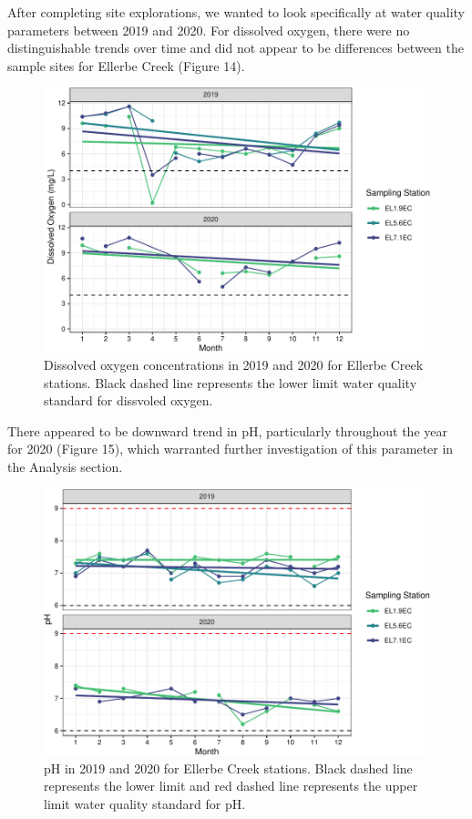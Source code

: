 \documentclass[
  12pt,
]{article}
\begin{document}
After completing site explorations, we wanted to look specifically at
water quality parameters between 2019 and 2020. For dissolved oxygen,
there were no distinguishable trends over time and did not appear to be
differences between the sample sites for Ellerbe Creek (Figure 14).

\begin{figure}
\centering
\includegraphics{August_Lindborg_ENV872_Project_files/figure-latex/unnamed-chunk-15-1.pdf}
\caption{Dissolved oxygen concentrations in 2019 and 2020 for Ellerbe
Creek stations. Black dashed line represents the lower limit water
quality standard for dissvoled oxygen.}
\end{figure}

There appeared to be downward trend in pH, particularly throughout the
year for 2020 (Figure 15), which warranted further investigation of this
parameter in the Analysis section.

\begin{figure}
\centering
\includegraphics{August_Lindborg_ENV872_Project_files/figure-latex/unnamed-chunk-16-1.pdf}
\caption{pH in 2019 and 2020 for Ellerbe Creek stations. Black dashed
line represents the lower limit and red dashed line represents the upper
limit water quality standard for pH.}
\end{figure}
\end{document}
